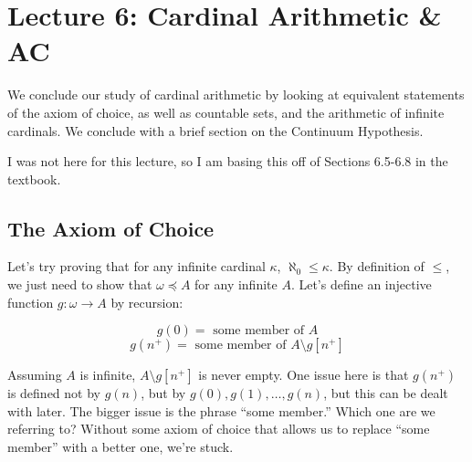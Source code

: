 \chapter{Lecture 6: Cardinal Arithmetic \& AC}

We conclude our study of cardinal arithmetic by looking at equivalent statements of the axiom of choice, as well as countable sets, and the arithmetic of infinite cardinals. We conclude with a brief section on the Continuum Hypothesis. 

\begin{remark}
    I was not here for this lecture, so I am basing this off of Sections 6.5-6.8 in the textbook.
\end{remark}

\section{The Axiom of Choice}

Let's try proving that for any infinite cardinal $\kappa$, $\aleph_0 \leq \kappa$. By definition of $\leq$, we just need to show that $\omega \preceq A$ for any infinite $A$. Let's define an injective function $g: \omega \to A$ by recursion:

\[g(0) = \text{ some member of $A$}\]
\[g(n^+) = \text{ some member of $A \setminus g[n^+]$}\]

Assuming $A$ is infinite, $A \setminus g[n^+]$ is never empty. One issue here is that $g(n^+)$ is defined not by $g(n)$, but by $g(0), g(1), \ldots, g(n)$, but this can be dealt with later. The bigger issue is the phrase ``some member.'' Which one are we referring to? Without some axiom of choice that allows us to replace ``some member'' with a better one, we're stuck. 

